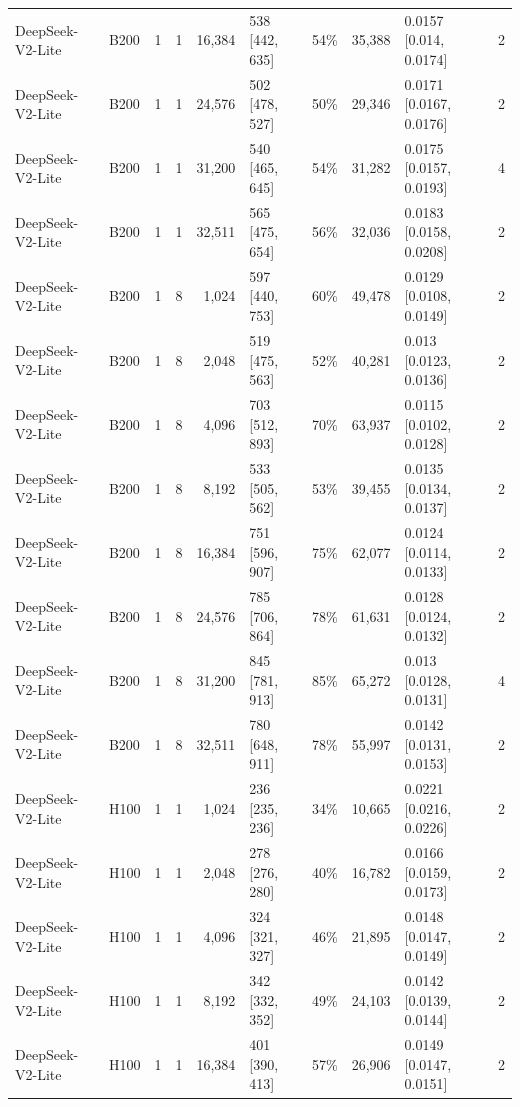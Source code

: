 \begin{landscape}
\begin{longtable}{llrrrlrrlr}
DeepSeek-V2-Lite & B200 & 1 & 1 & 16,384 & 538 {[}442, 635{]} & 54\% & 35,388 & 0.0157 {[}0.014, 0.0174{]} & 2 \\
DeepSeek-V2-Lite & B200 & 1 & 1 & 24,576 & 502 {[}478, 527{]} & 50\% & 29,346 & 0.0171 {[}0.0167, 0.0176{]} & 2 \\
DeepSeek-V2-Lite & B200 & 1 & 1 & 31,200 & 540 {[}465, 645{]} & 54\% & 31,282 & 0.0175 {[}0.0157, 0.0193{]} & 4 \\
DeepSeek-V2-Lite & B200 & 1 & 1 & 32,511 & 565 {[}475, 654{]} & 56\% & 32,036 & 0.0183 {[}0.0158, 0.0208{]} & 2 \\
DeepSeek-V2-Lite & B200 & 1 & 8 & 1,024 & 597 {[}440, 753{]} & 60\% & 49,478 & 0.0129 {[}0.0108, 0.0149{]} & 2 \\
DeepSeek-V2-Lite & B200 & 1 & 8 & 2,048 & 519 {[}475, 563{]} & 52\% & 40,281 & 0.013 {[}0.0123, 0.0136{]} & 2 \\
DeepSeek-V2-Lite & B200 & 1 & 8 & 4,096 & 703 {[}512, 893{]} & 70\% & 63,937 & 0.0115 {[}0.0102, 0.0128{]} & 2 \\
DeepSeek-V2-Lite & B200 & 1 & 8 & 8,192 & 533 {[}505, 562{]} & 53\% & 39,455 & 0.0135 {[}0.0134, 0.0137{]} & 2 \\
DeepSeek-V2-Lite & B200 & 1 & 8 & 16,384 & 751 {[}596, 907{]} & 75\% & 62,077 & 0.0124 {[}0.0114, 0.0133{]} & 2 \\
DeepSeek-V2-Lite & B200 & 1 & 8 & 24,576 & 785 {[}706, 864{]} & 78\% & 61,631 & 0.0128 {[}0.0124, 0.0132{]} & 2 \\
DeepSeek-V2-Lite & B200 & 1 & 8 & 31,200 & 845 {[}781, 913{]} & 85\% & 65,272 & 0.013 {[}0.0128, 0.0131{]} & 4 \\
DeepSeek-V2-Lite & B200 & 1 & 8 & 32,511 & 780 {[}648, 911{]} & 78\% & 55,997 & 0.0142 {[}0.0131, 0.0153{]} & 2 \\
DeepSeek-V2-Lite & H100 & 1 & 1 & 1,024 & 236 {[}235, 236{]} & 34\% & 10,665 & 0.0221 {[}0.0216, 0.0226{]} & 2 \\
DeepSeek-V2-Lite & H100 & 1 & 1 & 2,048 & 278 {[}276, 280{]} & 40\% & 16,782 & 0.0166 {[}0.0159, 0.0173{]} & 2 \\
DeepSeek-V2-Lite & H100 & 1 & 1 & 4,096 & 324 {[}321, 327{]} & 46\% & 21,895 & 0.0148 {[}0.0147, 0.0149{]} & 2 \\
DeepSeek-V2-Lite & H100 & 1 & 1 & 8,192 & 342 {[}332, 352{]} & 49\% & 24,103 & 0.0142 {[}0.0139, 0.0144{]} & 2 \\
DeepSeek-V2-Lite & H100 & 1 & 1 & 16,384 & 401 {[}390, 413{]} & 57\% & 26,906 & 0.0149 {[}0.0147, 0.0151{]} & 2 \\

\end{longtable}
\end{landscape}
